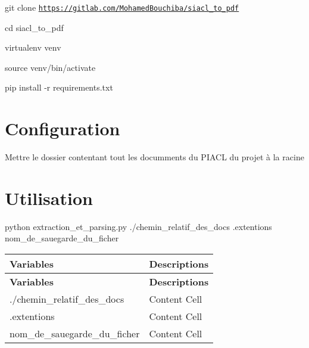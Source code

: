 
\begin{DoxyEnumerate}
\item git clone \href{https://gitlab.com/MohamedBouchiba/siacl_to_pdf}{\tt https\+://gitlab.\+com/\+Mohamed\+Bouchiba/siacl\+\_\+to\+\_\+pdf}
\item cd siacl\+\_\+to\+\_\+pdf
\item virtualenv venv
\item source venv/bin/activate
\item pip install -\/r requirements.\+txt
\end{DoxyEnumerate}

\section*{Configuration}

Mettre le dossier contentant tout les documments du P\+I\+A\+CL du projet à la racine

\section*{Utilisation}


\begin{DoxyCode}
python extraction\_et\_parsing.py ./chemin\_relatif\_des\_docs .extentions nom\_de\_sauegarde\_du\_ficher
\end{DoxyCode}






\tabulinesep=1mm
\begin{longtabu} spread 0pt [c]{*{2}{|X[-1]}|}
\hline
\rowcolor{\tableheadbgcolor}\textbf{ Variables }&\textbf{ Descriptions  }\\
\endfirsthead
\hline
\endfoot
\hline
\rowcolor{\tableheadbgcolor}\textbf{ Variables }&\textbf{ Descriptions  }\\
\endhead
./chemin\+\_\+relatif\+\_\+des\+\_\+docs &Content Cell \\
.extentions &Content Cell \\
nom\+\_\+de\+\_\+sauegarde\+\_\+du\+\_\+ficher &Content Cell \\
\end{longtabu}
